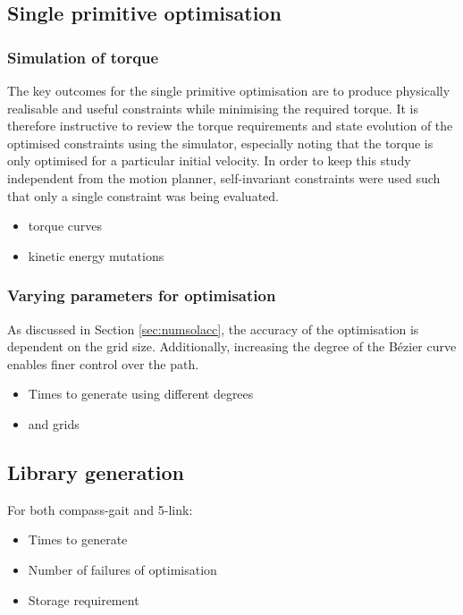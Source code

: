 \subsection{Single primitive optimisation}
\subsubsection{Simulation of torque}
The key outcomes for the single primitive optimisation are to produce physically realisable and useful constraints while minimising the required torque. It is therefore instructive to review the torque requirements and state evolution of the optimised constraints using the simulator, especially noting that the torque is only optimised for a particular initial velocity. In order to keep this study independent from the motion planner, self-invariant constraints were used such that only a single constraint was being evaluated.

\begin{itemize}
	\item torque curves
	\item kinetic energy mutations
\end{itemize}

\subsubsection{Varying parameters for optimisation}
As discussed in Section \ref{sec:numsolacc}, the accuracy of the optimisation is dependent on the grid size. Additionally, increasing the degree of the Bézier curve enables finer control over the path.

\begin{itemize}
	\item Times to generate using different degrees
	\item and grids
\end{itemize}

\subsection{Library generation}
For both compass-gait and 5-link:
\begin{itemize}
	\item Times to generate
	\item Number of failures of optimisation
	\item Storage requirement
\end{itemize}